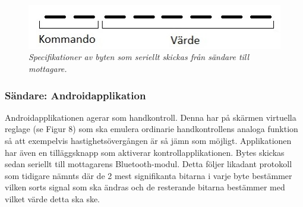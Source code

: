 \documentclass[a4paper]{article}
\begin{document}
\begin{figure}[H]
\includegraphics[scale=1]{aByteComVal.jpg}
\centering
\caption{\it Specifikationer av byten som seriellt skickas från sändare till mottagare.}
\end{figure} 








\subsubsection{Sändare: Androidapplikation}
Androidapplikationen agerar som handkontroll. Denna har på skärmen virtuella reglage (se Figur 8) som ska emulera ordinarie handkontrollens analoga funktion så att exempelvis hastighetsövergången är så jämn som möjligt. Applikationen har även en tilläggsknapp som aktiverar kontrollapplikationen. Bytes skickas sedan seriellt till mottagarens Bluetooth-modul. Detta följer likadant protokoll som tidigare nämnts där de 2 mest signifikanta bitarna i varje byte bestämmer vilken sorts signal som ska ändras och de resterande bitarna bestämmer med vilket värde detta ska ske. 
\end{document}
